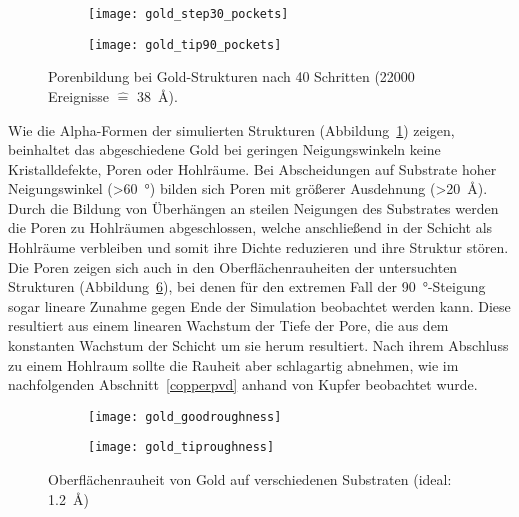 \begin{figure}
  \captionsetup[subfigure]{singlelinecheck=false}
  \def\subfigwidth{0.49\textwidth}

  \begin{subfigure}[t]{\subfigwidth}
    \texttt{[image: gold\_step30\_pockets]}
    \label{fig:goldpockets-a}
  \end{subfigure}
  \hfill
  \begin{subfigure}[t]{\subfigwidth}
    \texttt{[image: gold\_tip90\_pockets]}
    \label{fig:goldpockets-b}
  \end{subfigure}

  \caption[Porenbildung bei Gold-Strukturen]{Porenbildung bei Gold-Strukturen nach 40 Schritten (\num{22000} Ereignisse $\hat{=}$ \SI{38}{\angstrom}).
  }
  \label{fig:goldpockets}
\end{figure}

Wie die Alpha-Formen der simulierten Strukturen (Abbildung~\ref{fig:goldpockets-a}) zeigen, beinhaltet das abgeschiedene Gold bei geringen Neigungswinkeln keine Kristalldefekte, Poren oder Hohlräume.
Bei Abscheidungen auf Substrate hoher Neigungswinkel (>\SI{60}{\degree}) bilden sich Poren mit größerer Ausdehnung (>\SI{20}{\angstrom}).
Durch die Bildung von Überhängen an steilen Neigungen des Substrates werden die Poren zu Hohlräumen abgeschlossen, welche anschließend in der Schicht als Hohlräume verbleiben und somit ihre Dichte reduzieren und ihre Struktur stören.
Die Poren zeigen sich auch in den Oberflächenrauheiten der untersuchten Strukturen (Abbildung~\ref{fig:goldroughness}), bei denen für den extremen Fall der \SI{90}{\degree}-Steigung sogar lineare Zunahme gegen Ende der Simulation beobachtet werden kann.
Diese resultiert aus einem linearen Wachstum der Tiefe der Pore, die aus dem konstanten Wachstum der Schicht um sie herum resultiert.
Nach ihrem Abschluss zu einem Hohlraum sollte die Rauheit aber schlagartig abnehmen, wie im nachfolgenden Abschnitt~\ref{copperpvd} anhand von Kupfer beobachtet wurde.

\begin{figure}
  \captionsetup[subfigure]{singlelinecheck=false}
  \def\subfigwidth{0.49\textwidth}

  \begin{subfigure}[t]{\subfigwidth}
    \texttt{[image: gold\_goodroughness]}
    \label{fig:goldroughness-a}
  \end{subfigure}
  \hfill
  \begin{subfigure}[t]{\subfigwidth}
    \texttt{[image: gold\_tiproughness]}
    \label{fig:goldroughness-b}
  \end{subfigure}

  \caption[Oberflächenrauheit von Gold]{
    Oberflächenrauheit von Gold auf verschiedenen Substraten (ideal: \SI{1.2}{\angstrom})
  }
  \label{fig:goldroughness}

\end{figure}

